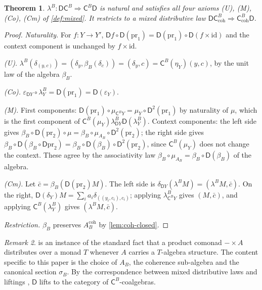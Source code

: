 \documentclass[11pt]{article}
\newtheorem{theorem}{Theorem}[section]
\theoremstyle{definition}
\theoremstyle{remark}
\newtheorem{remark}[theorem]{Remark}
\newcommand{\D}{\mathsf{D}}
\newcommand{\C}{\mathsf{C}}
\newcommand{\id}{\mathrm{id}}
\begin{document}
\begin{theorem}\label{thm:relative-law}
$\lambda^B\colon\D\C^B\Rightarrow\C^B\D$ is natural and satisfies all four axioms (U), (M), (Co),
(Cm) of \cref{def:mixed}. It restricts to a mixed distributive law $\D\C^B_{\mathrm{coh}}\Rightarrow
\C^B_{\mathrm{coh}}\D$.
\end{theorem}
\begin{proof}
\emph{Naturality.} For $f\colon Y\to Y'$, $\D f\circ\D(\mathrm{pr}_1)=\D(\mathrm{pr}_1)\circ\D(f\times\id)$
and the context component is unchanged by $f\times\id$.

\emph{(U).} $\lambda^B(\delta_{(y,c)})=(\delta_y,\beta_B(\delta_c))=(\delta_y,c)=\C^B(\eta_Y)(y,c)$, by the
unit law of the algebra $\beta_B$.

\emph{(Co).} $\varepsilon_{\D Y}\circ\lambda^B_Y=\D(\mathrm{pr}_1)=\D(\varepsilon_Y)$.

\emph{(M).} First components: $\D(\mathrm{pr}_1)\circ\mu_{\C^BY}=\mu_Y\circ\D^2(\mathrm{pr}_1)$ by
naturality of $\mu$, which is the first component of $\C^B(\mu_Y)\lambda^B_{\D Y}\D(\lambda^B_Y)$.
Context components: the left side gives
$\beta_B\circ\D(\mathrm{pr}_2)\circ\mu=\beta_B\circ\mu_{A_B}\circ\D^2(\mathrm{pr}_2)$; the right side gives
$\beta_B\circ\D(\beta_B\circ\D\mathrm{pr}_2)=\beta_B\circ\D(\beta_B)\circ\D^2(\mathrm{pr}_2)$, since
$\C^B(\mu_Y)$ does not change the context. These agree by the associativity law
$\beta_B\circ\mu_{A_B}=\beta_B\circ\D(\beta_B)$ of the algebra.

\emph{(Cm).} Let $\bar c=\beta_B(\D(\mathrm{pr}_2)M)$. The left side is
$\delta_{\D Y}(\lambda^BM)=(\lambda^BM,\bar c)$. On the right,
$\D(\delta_Y)M=\sum_ia_i\delta_{((y_i,c_i),c_i)}$; applying $\lambda^B_{\C^BY}$ gives $(M,\bar c)$, and
applying $\C^B(\lambda^B_Y)$ gives $(\lambda^BM,\bar c)$.

\emph{Restriction.} $\beta_B$ preserves $A^{\mathrm{coh}}_B$ by \cref{lem:coh-closed}.
\end{proof}

\begin{remark}
 is an instance of the standard fact that a product comonad $-\times A$
distributes over a monad $T$ whenever $A$ carries a $T$-algebra structure. The content specific to
this paper is the choice of $A_B$, the coherence sub-algebra and the canonical section $\sigma_B$. By
the correspondence between mixed distributive laws and liftings \cite{PowerWatanabe2002}, $\D$ lifts
to the category of $\C^B$-coalgebras.
\end{remark}
\end{document}
